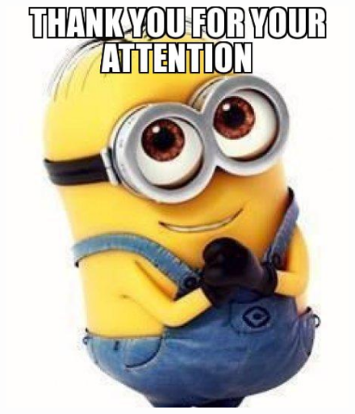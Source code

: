 \documentclass{beamer}
\begin{document}
	\begin{frame}{}
		\begin{figure}[H]
			\centering
			\includegraphics[scale=0.7]{multumesc.PNG}
		\end{figure}	
	\end{frame}
\end{document}
